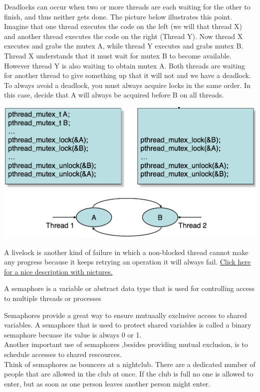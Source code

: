 Deadlocks can occur when two or more threads are each waiting for the other to finish, and thus neither gets done.  The picture below illustrates this point.  Imagine that one thread executes the code on the left (we will that thread X) and another thread executes the code on the right (Thread Y).  Now thread X executes and grabs the mutex A, while thread Y executes and grabs mutex B.  Thread X understands that it must wait for  mutex B to become available.  However thread Y is also waiting to obtain mutex A.  Both threads are waiting for another thread to give something up that it will not and we have a deadlock.  To always avoid a deadlock, you must always acquire locks in the same order.  In this case, decide that A will always be acquired before B on all threads.

\begin{center} %
    \includegraphics[scale=0.5]{threads/deadlock.png}
\end{center}

A livelock is another kind of failure in which a non-blocked thread cannot make any progress because it keeps retrying an operation it will always fail.
\href{http://www.guruzon.com/1/threading/multithreading-concepts/what-is-live-lock
}{Click here for a nice description with pictures.}




A semaphore is a variable or abstract data type that is used for controlling access to multiple threads or processes

Semaphores provide a great way to ensure mutuaally exclusive access to shared variables.  A semaphore that is used to protect shared variables is called a binary semaphore becuase its value is always 0 or 1.\\

Another important use of semaphores ,besides providing mutual exclusion, is to schedule accesses to shared rescources.\\

Think of semaphores as bouncers at a nightclub. There are a dedicated number of people that are allowed in the club at once. If the club is full no one is allowed to enter, but as soon as one person leaves another person might enter.

